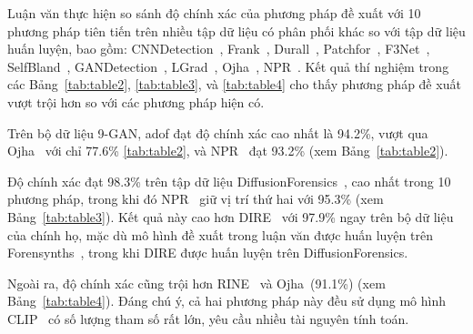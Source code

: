 %
Luận văn thực hiện so sánh độ chính xác của phương pháp đề xuất với 10 phương pháp tiên tiến trên nhiều tập dữ liệu có phân phối khác so với tập dữ liệu huấn luyện, bao gồm: 
CNNDetection~\cite{Wang2019CNNGeneratedIA}, 
Frank~\cite{Frank2020LeveragingFA}, 
Durall~\cite{Durall2020WatchYU}, 
Patchfor~\cite{Chai2020WhatMF}, 
F3Net~\cite{Qian2020ThinkingIF}, 
SelfBland~\cite{Shiohara2022DetectingDW}, 
GANDetection~\cite{Mandelli2022DetectingGI}, 
LGrad~\cite{Tan2023LearningOG}, 
Ojha~\cite{Ojha2023TowardsUF}, 
NPR~\cite{Tan2023RethinkingTU}. 
Kết quả thí nghiệm trong các Bảng~\ref{tab:table2}, \ref{tab:table3}, và \ref{tab:table4} cho thấy phương pháp đề xuất vượt trội hơn so với các phương pháp hiện có. 

Trên bộ dữ liệu 9-GAN, \gls{adof} đạt độ chính xác cao nhất là 94.2\%, vượt qua Ojha~\cite{Ojha2023TowardsUF} với chỉ 77.6\% \ref{tab:table2}, và NPR~\cite{Tan2023RethinkingTU} đạt 93.2\% (xem Bảng~\ref{tab:table2}).

Độ chính xác đạt 98.3\% trên tập dữ liệu DiffusionForensics~\cite{Wang2023DIREFD}, cao nhất trong 10 phương pháp, trong khi đó NPR~\cite{Tan2023RethinkingTU} giữ vị trí thứ hai với 95.3\% (xem Bảng~\ref{tab:table3}). Kết quả này cao hơn DIRE~\cite{Wang2023DIREFD} với 97.9\% ngay trên bộ dữ liệu của chính họ, mặc dù mô hình đề xuất trong luận văn được huấn luyện trên Forensynths~\cite{Krizhevsky2012ImageNetCW}, trong khi DIRE được huấn luyện trên DiffusionForensics.

Ngoài ra, độ chính xác cũng trội hơn RINE~\cite{koutlis2024leveraging} và Ojha~\cite{Ojha2023TowardsUF}(91.1\%) (xem Bảng~\ref{tab:table4}). Đáng chú ý, cả hai phương pháp này đều sử dụng mô hình CLIP~\cite{abs-2103-00020} có số lượng tham số rất lớn, yêu cầu nhiều tài nguyên tính toán.






